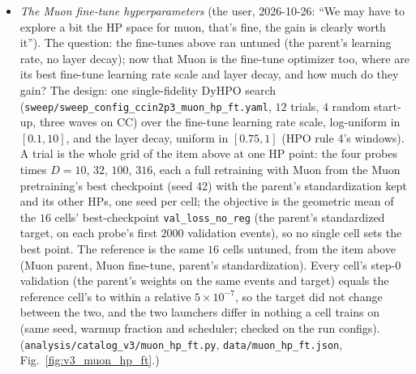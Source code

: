 \documentclass[11pt]{article}
\newcommand{\code}[1]{\texttt{#1}}
\begin{document}
\begin{itemize}
    sees: $0.542$, $0.372$, $0.365$ and $0.179$ over $D=10$, $32$, $100$ and $316$ events (the zero-shot read's split
    is larger again). The validation target, and with it the step-$0$ error, therefore shifts slightly with $D$ in
    every cell of that probe (refit and scratch too); the cells of one $D$ share it, so the comparisons above, all
    within one $D$, are unaffected.
  \item \emph{The Muon fine-tune hyperparameters} (the user, 2026-10-26: ``We may have to explore a bit the HP space for
    muon, that's fine, the gain is clearly worth it''). The question: the fine-tunes above ran untuned (the parent's
    learning rate, no layer decay); now that Muon is the fine-tune optimizer too, where are its best fine-tune
    learning rate scale and layer decay, and how much do they gain? The design: one single-fidelity DyHPO search
    (\code{sweep/sweep\_config\_ccin2p3\_muon\_hp\_ft.yaml}, $12$ trials, $4$ random start-up, three waves on CC) over
    the fine-tune learning rate scale, log-uniform in $[0.1, 10]$, and the layer decay, uniform in $[0.75, 1]$ (HPO
    rule 4's windows). A trial is the whole grid of the item above at one HP point: the four probes times $D=10$,
    $32$, $100$, $316$, each a full retraining with Muon from the Muon pretraining's best checkpoint (seed 42) with the
    parent's standardization kept and its other HPs, one seed per cell; the objective is the geometric mean of the
    $16$ cells' best-checkpoint \code{val\_loss\_no\_reg} (the parent's standardized target, on each probe's first
    $2000$ validation events), so no single cell sets the best point. The reference is the same $16$ cells untuned,
    from the item above (Muon parent, Muon fine-tune, parent's standardization). Every cell's step-$0$ validation (the
    parent's weights on the same events and target) equals the reference cell's to within a relative
    $5\times10^{-7}$, so the target did not change between the two, and the two launchers differ in nothing a cell
    trains on (same seed, warmup fraction and scheduler; checked on the run configs).
    (\code{analysis/catalog\_v3/muon\_hp\_ft.py}, \code{data/muon\_hp\_ft.json}, Fig.~\ref{fig:v3_muon_hp_ft}.)

\end{itemize}
\end{document}
